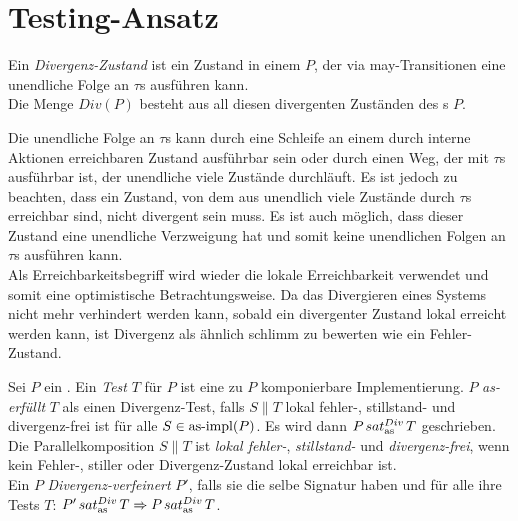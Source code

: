 \section{Testing-Ansatz}

\begin{Def}[Divergenz]
  Ein \emph{Divergenz-Zustand} ist ein Zustand in einem \MEIO{} $P$, der via
  may-Transitionen eine unendliche Folge an $\tau$s ausführen kann.\\
  Die Menge $Div(P)$ besteht aus all diesen divergenten Zuständen des \MEIO{}s
  $P$.
\end{Def}

Die unendliche Folge an $\tau$s kann durch eine Schleife an einem durch interne
Aktionen erreichbaren Zustand ausführbar sein oder durch einen Weg, der mit
$\tau$s ausführbar ist, der unendliche viele Zustände durchläuft. Es ist jedoch
zu beachten, dass ein Zustand, von dem aus unendlich viele Zustände durch
$\tau$s  erreichbar sind, nicht divergent sein muss. Es ist auch möglich, dass
dieser Zustand eine unendliche Verzweigung hat und somit keine unendlichen
Folgen an $\tau$s ausführen kann.\\
Als Erreichbarkeitsbegriff wird wieder die lokale Erreichbarkeit verwendet und
somit eine optimistische Betrachtungsweise. Da das Divergieren eines Systems
nicht mehr verhindert werden kann, sobald ein divergenter Zustand lokal
erreicht werden kann, ist Divergenz als ähnlich \glqq schlimm\grqq{} zu
bewerten wie ein Fehler-Zustand.

\begin{Def}
  \label{DivTestDef}
  Sei $P$ ein \MEIO{}. Ein \emph{Test} $T$ für $P$ ist eine zu $P$
  komponierbare Implementierung. $P$ \emph{as-erfüllt} $T$ als einen
  Divergenz-Test, falls $S\|T$ lokal fehler-, stillstand- und divergenz-frei
  ist für alle $S\in \mathrm{as}\text{-}\mathrm{impl} (P)$. Es wird dann $P\hspace{0.05cm}sat_\mathrm{as}^{Div}\hspace{0.05cm} T$ geschrieben. Die
  Parallelkomposition $S\|T$ ist \emph{lokal fehler-}, \emph{stillstand-} und
  \emph{divergenz-frei}, wenn kein Fehler-, stiller oder Divergenz-Zustand
  lokal erreichbar ist.\\
  Ein \MEIO{} $P$ \emph{Divergenz-verfeinert} $P'$, falls sie die selbe
  Signatur haben und für alle ihre Tests $T$: $P'\hspace{0.05cm}sat_\mathrm{as}^{Div}\hspace{0.05cm} T \Rightarrow P\hspace{0.05cm}sat_\mathrm{as}^{Div}\hspace{0.05cm}
  T$.
\end{Def}


